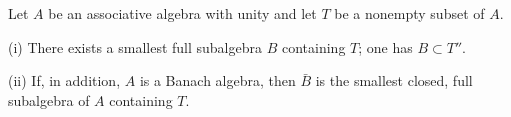 Let $A$ be an associative algebra with unity and let $T$ be a nonempty subset of $A$.

(i) There exists a smallest full subalgebra $B$ containing $T$; one has $B \subset T''$.

(ii) If, in addition, $A$ is a Banach algebra, then $\bar{B}$ is the smallest closed, full subalgebra of $A$ containing $T$.
